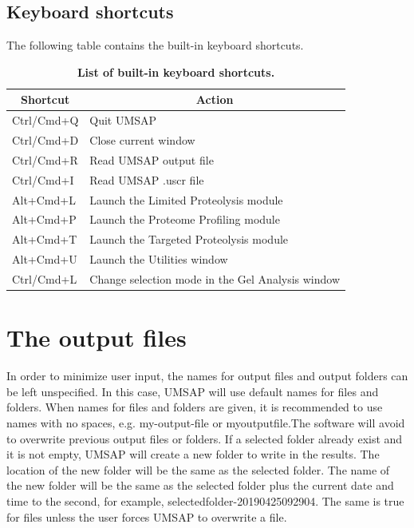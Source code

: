 \subsection{Keyboard shortcuts}

The following table contains the built-in keyboard shortcuts.

\begin{table}[h!]
	\centering
	\begin{tabular}{l l}
		\hline
		\multicolumn{1}{c}{Shortcut} & \multicolumn{1}{c}{Action} \\
		\hline
		Ctrl/Cmd+Q & Quit UMSAP                \\
		Ctrl/Cmd+D & Close current window \\
		Ctrl/Cmd+R & Read UMSAP output file \\
		Ctrl/Cmd+I  & Read UMSAP .uscr file  \\		
		Alt+Cmd+L & Launch the Limited Proteolysis module \\
		Alt+Cmd+P & Launch the Proteome Profiling module \\
		Alt+Cmd+T & Launch the Targeted Proteolysis module \\
		Alt+Cmd+U & Launch the Utilities window \\
		Ctrl/Cmd+L & Change selection mode in the Gel Analysis window\\		
		\hline		
	\end{tabular}
	\caption[List of built-in keyboard shortcuts]{\textbf{List of built-in keyboard shortcuts.}}
	\label{table:shortcuts}
\end{table}



\section{The output files}

In order to minimize user input, the names for output files and output folders can be left unspecified. In this case, UMSAP will use default names for files and folders. When names for files and folders are given, it is recommended to use names with no spaces, e.g. my-output-file or myoutputfile.The software will avoid to overwrite previous output files or folders. If a selected folder already exist and it is not empty, UMSAP will create a new folder to write in the results. The location of the new folder will be the same as the selected folder. The name of the new folder will be the same as the selected folder plus the current date and time to the second, for example, selectedfolder-20190425092904. The same is true for files unless the user forces UMSAP to overwrite a file. 

